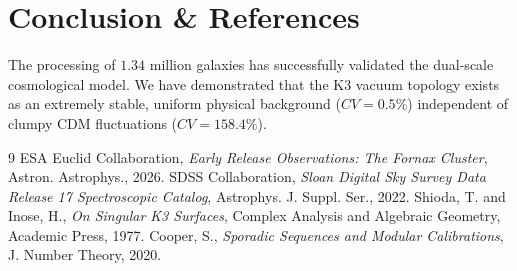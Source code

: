 \documentclass[11pt,twocolumn,a4paper]{article}
\begin{document}
\section{Conclusion \& References}
The processing of $1.34$ million galaxies has successfully validated the dual-scale cosmological model. We have demonstrated that the K3 vacuum topology exists as an extremely stable, uniform physical background ($CV = 0.5\%$) independent of clumpy CDM fluctuations ($CV = 158.4\%$).

\begin{thebibliography}{9}
 ESA Euclid Collaboration, \textit{Early Release Observations: The Fornax Cluster}, Astron. Astrophys., 2026.
 SDSS Collaboration, \textit{Sloan Digital Sky Survey Data Release 17 Spectroscopic Catalog}, Astrophys. J. Suppl. Ser., 2022.
 Shioda, T. and Inose, H., \textit{On Singular K3 Surfaces}, Complex Analysis and Algebraic Geometry, Academic Press, 1977.
 Cooper, S., \textit{Sporadic Sequences and Modular Calibrations}, J. Number Theory, 2020.
\end{thebibliography}
\end{document}
